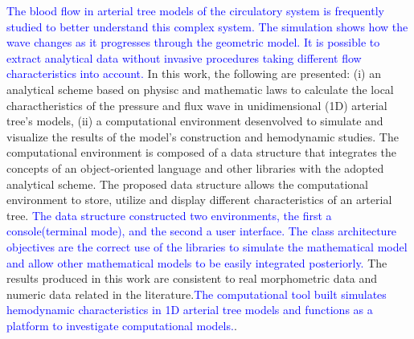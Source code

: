 \documentclass[msc,divps,pdftex]{mmc}
\newcommand{\igunew}[1]{\textcolor{blue}{#1}}
\begin{document}
\begin{foreignabstract}
	\justifying
	\igunew{The blood flow in arterial tree models of the circulatory system is frequently studied to better understand this complex system. The simulation shows how the wave changes as it progresses through the geometric model. It is possible to extract analytical data without invasive procedures taking different flow characteristics into account.}
	In this work, the following are presented: (i) an analytical scheme based on physisc and mathematic laws to calculate the local charactheristics of the pressure and flux wave in unidimensional (1D) arterial tree's models, (ii) a computational environment desenvolved to simulate and visualize the results of the model's construction and hemodynamic studies. 
	The computational environment is composed of a data structure that integrates the concepts of an object-oriented language and other libraries with the adopted analytical scheme.
	The proposed data structure allows the computational environment to store, utilize and display different characteristics of an arterial tree. \igunew{The data structure constructed two environments, the first a console(terminal mode), and the second a user interface. The class architecture objectives are the correct use of the libraries to simulate the mathematical model and allow other mathematical models to be easily integrated posteriorly.}
	The results produced in this work are consistent to real morphometric data and numeric data related in the literature.\igunew{The computational tool built simulates hemodynamic characteristics in 1D arterial tree models and functions as a platform to investigate computational models.}.
\end{foreignabstract}





\listoffigures  %
\listoftables


\tableofcontents




\mainmatter


%
%
%
 
\end{document}
